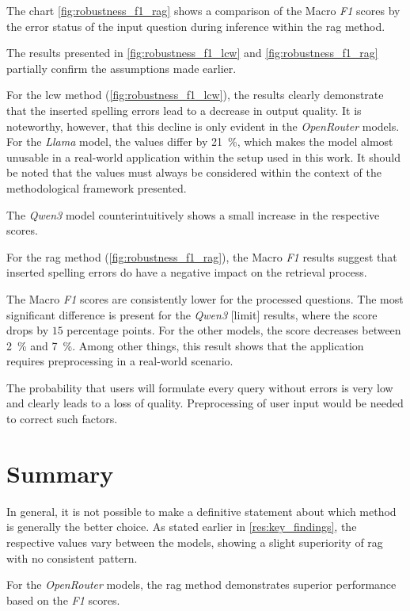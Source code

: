 The chart \cref{fig:robustness_f1_rag} shows a comparison of the Macro \textit{F1} scores by the error status of the input question during inference within the \ac{rag} method.

The results presented in \cref{fig:robustness_f1_lcw} and \cref{fig:robustness_f1_rag} partially confirm the assumptions made earlier.

For the \ac{lcw} method (\cref{fig:robustness_f1_lcw}), the results clearly demonstrate that the inserted spelling errors lead to a decrease in output quality.
It is noteworthy, however, that this decline is only evident in the \textit{OpenRouter} models.
For the \textit{Llama} model, the values differ by \SI{21}{\%}, which makes the model almost unusable in a real-world application within the setup used in this work.
It should be noted that the values must always be considered within the context of the methodological framework presented.

The \textit{Qwen3} model counterintuitively shows a small increase in the respective scores.

For the \ac{rag} method (\cref{fig:robustness_f1_rag}), the Macro \textit{F1} results suggest that inserted spelling errors do have a negative impact on the retrieval process.

The Macro \textit{F1} scores are consistently lower for the processed questions.
The most significant difference is present for the \textit{Qwen3} [limit] results, where the score drops by $15$ percentage points.  
For the other models, the score decreases between \SI{2}{\%} and \SI{7}{\%}.
Among other things, this result shows that the application requires preprocessing in a real-world scenario.

The probability that users will formulate every query without errors is very low and clearly leads to a loss of quality.
Preprocessing of user input would be needed to correct such factors.

\section{Summary}

In general, it is not possible to make a definitive statement about which method is generally the better choice.
As stated earlier in \cref{res:key_findings}, the respective values vary between the models, showing a slight superiority of \ac{rag} with no consistent pattern.

For the \textit{OpenRouter} models, the \ac{rag} method demonstrates superior performance based on the \textit{F1} scores.

